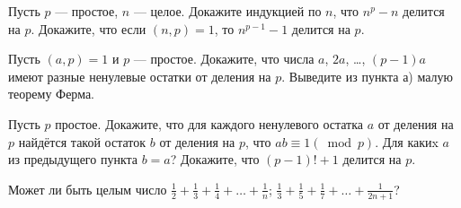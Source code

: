 \documentclass[12pt,a4paper]{article}
\begin{document}

Пусть $p$ --- простое, $n$ --- целое.
 Докажите индукцией по $n$, что $n^p-n$ делится на $p$.
  Докажите, что если $(n,p)=1$, то $n^{p-1}-1$ делится на $p$.


 Пусть $(a,p)=1$ и $p$ --- простое.  Докажите, что
числа $a$, $2a$, \dots, $(p-1)a$ имеют разные ненулевые остатки от деления на $p$.
 Выведите из пункта а) малую теорему Ферма.

Пусть $p$ простое.  Докажите, что для каждого ненулевого остатка $a$ от деления на $p$ найдётся такой остаток $b$
от деления на $p$, что $ab\equiv 1 (\bmod p)$.
 Для какиx $a$ из предыдущего пункта $b=a$?
 Докажите, что $(p-1)!+1$ делится на $p$.



 Может ли быть целым число
$\displaystyle{\frac{1}{2}+\frac{1}{3}+\frac{1}{4}+\ldots+\frac{1}{n}}$;
$\displaystyle{\frac{1}{3}+\frac{1}{5}+\frac{1}{7}+\ldots+\frac{1}{2n+1}}$?


%

%
%
%
%
\end{document}
